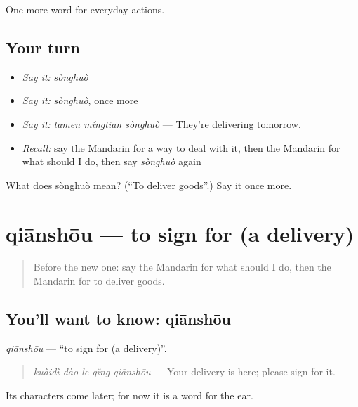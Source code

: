 \begin{grammarlens}[title={What you've built}]
One more word for everyday actions.
\end{grammarlens}

\subsection*{Your turn}
\begin{itemize}
\raggedright
  \item \emph{Say it:} \emph{sònghuò}
  \item \emph{Say it:} \emph{sònghuò}, once more
  \item \emph{Say it:} \emph{tāmen míngtiān sònghuò} — They're delivering tomorrow.
  \item \emph{Recall:} say the Mandarin for a way to deal with it, then the Mandarin for what should I do, then say \emph{sònghuò} again
\end{itemize}

\begin{tcolorbox}[breakable,colback=teal!4,colframe=teal!35!black,title={Before you move on}]
What does sònghuò mean? (\textquotedblleft{}To deliver goods\textquotedblright{}.) Say it once more.
\end{tcolorbox}
\section[qiānshōu]{qiānshōu — to sign for (a delivery)}

\label{lesson:ZH-C215-qianshou}



\begin{quote}
Before the new one: say the Mandarin for what should I do, then the Mandarin for to deliver goods.
\end{quote}

\subsection*{You'll want to know: qiānshōu}
\emph{qiānshōu} — \textquotedblleft{}to sign for (a delivery)\textquotedblright{}.

\begin{quote}
\emph{kuàidì dào le qǐng qiānshōu} — Your delivery is here; please sign for it.
\end{quote}

Its characters come later; for now it is a word for the ear.

